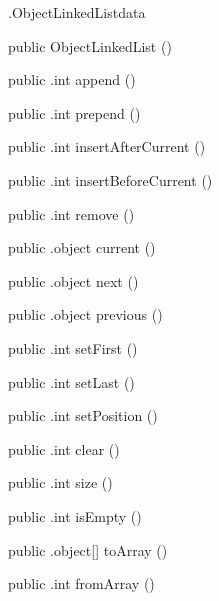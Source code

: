 \begin{CrexxClass}{.ObjectLinkedList}{data}

  \begin{Hierarchy}
  \end{Hierarchy}

  \begin{Members}

    \Factory
      {public}
      {ObjectLinkedList}
      {()}

    \Method
      {public}
      {.int}
      {append}
      {()}

    \Method
      {public}
      {.int}
      {prepend}
      {()}

    \Method
      {public}
      {.int}
      {insertAfterCurrent}
      {()}

    \Method
      {public}
      {.int}
      {insertBeforeCurrent}
      {()}

    \Method
      {public}
      {.int}
      {remove}
      {()}

    \Method
      {public}
      {.object}
      {current}
      {()}

    \Method
      {public}
      {.object}
      {next}
      {()}

    \Method
      {public}
      {.object}
      {previous}
      {()}

    \Method
      {public}
      {.int}
      {setFirst}
      {()}

    \Method
      {public}
      {.int}
      {setLast}
      {()}

    \Method
      {public}
      {.int}
      {setPosition}
      {()}

    \Method
      {public}
      {.int}
      {clear}
      {()}

    \Method
      {public}
      {.int}
      {size}
      {()}

    \Method
      {public}
      {.int}
      {isEmpty}
      {()}

    \Method
      {public}
      {.object[]}
      {toArray}
      {()}

    \Method
      {public}
      {.int}
      {fromArray}
      {()}

  \end{Members}
\end{CrexxClass}

